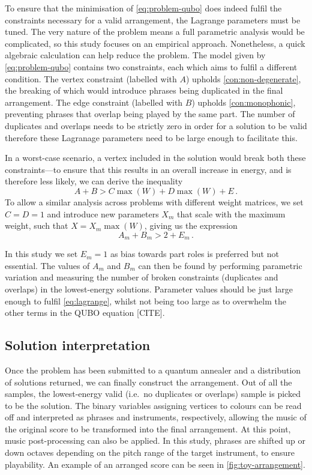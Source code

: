 \documentclass[12pt]{article}
\theoremstyle{definition}
\begin{document}
To ensure that the minimisation of \cref{eq:problem-qubo} does indeed fulfil the constraints necessary for a valid arrangement, the Lagrange parameters must be tuned. The very nature of the problem means a full parametric analysis would be complicated, so this study focuses on an empirical approach.
Nonetheless, a quick algebraic calculation can help reduce the problem. The model given by \cref{eq:problem-qubo} contains two constraints, each which aims to fulfil a different condition. The vertex constraint (labelled with $A$) upholds \cref{con:non-degenerate}, the breaking of which would introduce phrases being duplicated in the final arrangement. The edge constraint (labelled with $B$) upholds \cref{con:monophonic}, preventing phrases that overlap being played by the same part. The number of duplicates and overlaps needs to be strictly zero in order for a solution to be valid therefore these Lagranage parameters need to be large enough to facilitate this.

In a worst-case scenario, a vertex included in the solution would break both these constraints---to ensure that this results in an overall increase in energy, and is therefore less likely, we can derive the inequality
\begin{equation}
    A + B > C\max(W) + D\max(W) + E \,.
\end{equation}
To allow a similar analysis across problems with different weight matrices, we set $C=D=1$ and introduce new parameters $X_m$ that scale with the maximum weight, such that $X = X_m\max(W)$, giving us the expression
\begin{equation}
    A_m + B_m > 2 + E_m \,.
    \label{eq:lagrange}
\end{equation}

In this study we set $E_m=1$ as bias towards part roles is preferred but not essential. The values of $A_m$ and $B_m$ can then be found by performing parametric variation and measuring the number of broken constraints (duplicates and overlaps) in the lowest-energy solutions. Parameter values should be just large enough to fulfil \cref{eq:lagrange}, whilst not being too large as to overwhelm the other terms in the QUBO equation [CITE].

\subsection{Solution interpretation}

Once the problem has been submitted to a quantum annealer and a distribution of solutions returned, we can finally construct the arrangement. Out of all the samples, the lowest-energy valid (i.e.\ no duplicates or overlaps) sample is picked to be the solution. The binary variables assigning vertices to colours can be read off and interpreted as phrases and instruments, respectively, allowing the music of the original score to be transformed into the final arrangement.
At this point, music post-processing can also be applied. In this study, phrases are shifted up or down octaves depending on the pitch range of the target instrument, to ensure playability. An example of an arranged score can be seen in \cref{fig:toy-arrangement}.
\end{document}
